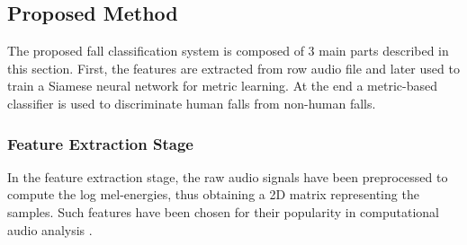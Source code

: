 \subsection{Proposed Method}
The proposed fall classification system is composed of 3 main parts described in this section.
First, the features are extracted from row audio file and later used to train a Siamese neural network for metric learning. At the end a metric-based classifier is used to discriminate human falls from non-human falls.

\subsubsection{Feature Extraction Stage}
In the feature extraction stage, the raw audio signals have been preprocessed to compute the log mel-energies, thus obtaining a 2D matrix representing the samples.
Such features have been chosen for their popularity in computational audio analysis \cite{gemmeke2013exemplar, mesaros2010acoustic, parascandolo2017convolutional}.

